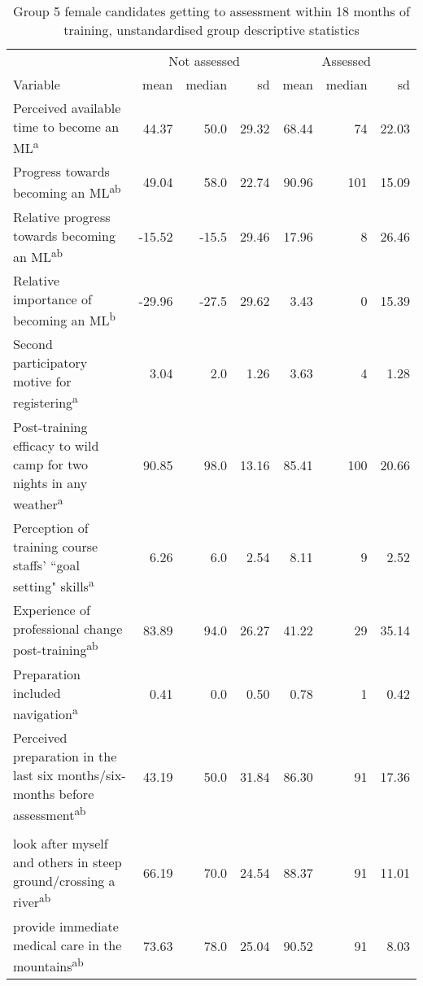 \documentclass[
  12pt,
  a4paper,
]{book}
\begin{document}
\begin{landscape}
\begin{table}
\caption{\label{tab:female-GTA-18m-combined-summary-stats}Group 5 female candidates getting to assessment within 18 months of training, unstandardised group descriptive statistics}
\centering
\begin{tabular}[t]{>{\raggedright\arraybackslash}p{12cm}rrrrrr}
\toprule
\multicolumn{1}{c}{ } & \multicolumn{3}{c}{Not assessed} & \multicolumn{3}{c}{Assessed} \\
\cmidrule(l{3pt}r{3pt}){2-4} \cmidrule(l{3pt}r{3pt}){5-7}
Variable & mean & median & sd & mean & median & sd\\
\midrule
\rowcolor{gray!6}  Perceived available time to become an ML\textsuperscript{a} & 44.37 & 50.0 & 29.32 & 68.44 & 74 & 22.03\\
Progress towards becoming an ML\textsuperscript{ab} & 49.04 & 58.0 & 22.74 & 90.96 & 101 & 15.09\\
\rowcolor{gray!6}  Relative progress towards becoming an ML\textsuperscript{ab} & -15.52 & -15.5 & 29.46 & 17.96 & 8 & 26.46\\
Relative importance of becoming an ML\textsuperscript{b} & -29.96 & -27.5 & 29.62 & 3.43 & 0 & 15.39\\
\rowcolor{gray!6}  Second participatory motive for registering\textsuperscript{a} & 3.04 & 2.0 & 1.26 & 3.63 & 4 & 1.28\\
Post-training efficacy to wild camp for two nights in any weather\textsuperscript{a} & 90.85 & 98.0 & 13.16 & 85.41 & 100 & 20.66\\
\rowcolor{gray!6}  Perception of training course staffs' ``goal setting" skills\textsuperscript{a} & 6.26 & 6.0 & 2.54 & 8.11 & 9 & 2.52\\
Experience of professional change post-training\textsuperscript{ab} & 83.89 & 94.0 & 26.27 & 41.22 & 29 & 35.14\\
\rowcolor{gray!6}  Preparation included navigation\textsuperscript{a} & 0.41 & 0.0 & 0.50 & 0.78 & 1 & 0.42\\
Perceived preparation in the last six months/six-months before assessment\textsuperscript{ab} & 43.19 & 50.0 & 31.84 & 86.30 & 91 & 17.36\\
\rowcolor{gray!6}  \addlinespace[0.3em]
\multicolumn{7}{l}{\textbf{Pre-assessment efficacy to...}}\\
\hspace{1em}look after myself and others in steep ground/crossing a river\textsuperscript{ab} & 66.19 & 70.0 & 24.54 & 88.37 & 91 & 11.01\\
\hspace{1em}provide immediate medical care in the mountains\textsuperscript{ab} & 73.63 & 78.0 & 25.04 & 90.52 & 91 & 8.03\\

\end{tabular}
\end{table}
\end{landscape}
\end{document}
